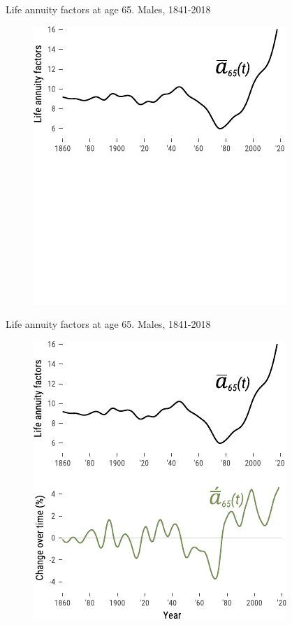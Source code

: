 \documentclass[10pt]{beamer}
\begin{document}
\begin{frame}{Life annuity factors at age 65. Males, 1841-2018}
\begin{figure}
	\centering
	\hspace*{-1cm}
	\includegraphics[scale=1.2] {Fig/axm0.pdf}
\end{figure}
\end{frame}



\begin{frame}{Life annuity factors at age 65. Males, 1841-2018}
\begin{figure}
	\centering
	\hspace*{-1cm}
	\includegraphics[scale=1.2] {Fig/axm.pdf}
\end{figure}
\end{frame}
\end{document}
